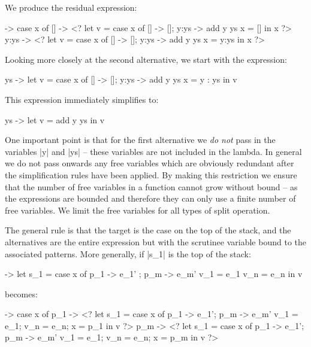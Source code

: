 \documentclass[draft]{sigplanconf}
\begin{document}
We produce the residual expression:

\begin{code}
\x ->  case x of
       []    -> <?  let  v =  case x of [] -> []; y:ys -> add y ys
                         x =  []
                    in   x ?>
       y:ys  -> <?  let  v =  case x of [] -> []; y:ys -> add y ys
                         x =  y:ys
                    in   x ?>
\end{code}

Looking more closely at the second alternative, we start with the expression:

\begin{code}
\y ys ->  let  v  = case x of [] -> []; y:ys -> add y ys
               x  = y : ys
          in   v
\end{code}

This expression immediately simplifies to:

\begin{code}
\y ys ->  let  v = add y ys
          in   v
\end{code}

One important point is that for the first alternative we \textit{do not} pass in the variables |y| and |ys| -- these variables are not included in the lambda. In general we do not pass onwards any free variables which are obviously redundant after the simplification rules have been applied. By making this restriction we ensure that the number of free variables in a function cannot grow without bound -- as the expressions are bounded and therefore they can only use a finite number of free variables. We limit the free variables for all types of split operation.

The general rule is that the target is the case on the top of the stack, and the alternatives are the entire expression but with the scrutinee variable bound to the associated patterns. More generally, if |s_1| is the top of the stack:

\begin{code}
\free ->  let  s_1  = case x of p_1 -> e_1' ; p_m -> e_m'
               v_1  = e_1
               v_n  = e_n
          in   v
\end{code}

\noindent becomes:

\begin{code}
\free -> case x of
    p_1  -> <? let  s_1 = case x of p_1 -> e_1'; p_m -> e_m'
                    v_1 = e_1; v_n = e_n; x = p_1 in v ?>
    p_m  -> <? let  s_1 = case x of p_1 -> e_1'; p_m -> e_m'
                    v_1 = e_1; v_n = e_n; x = p_m in v ?>
\end{code}
\end{document}
